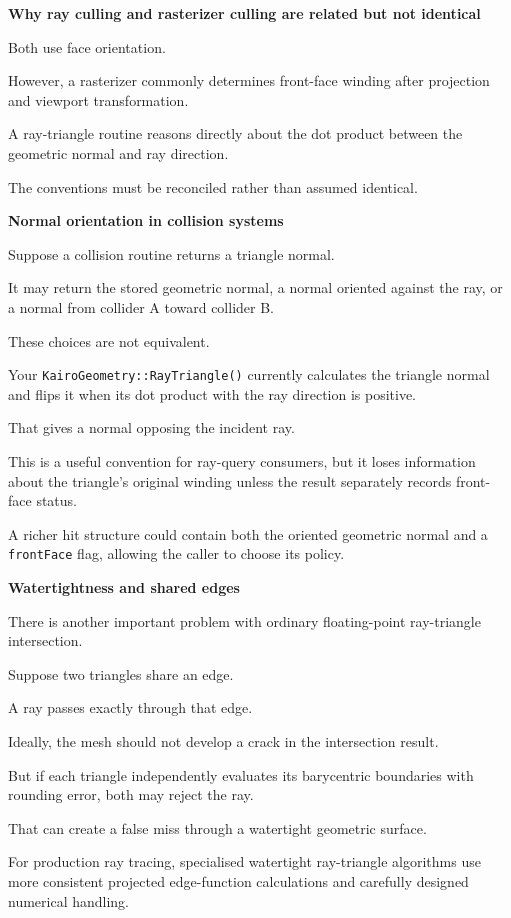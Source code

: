 \textbf{Why ray culling and rasterizer culling are related but not identical}

Both use face orientation.

However, a rasterizer commonly determines front-face winding after projection and viewport transformation.

A ray-triangle routine reasons directly about the dot product between the geometric normal and ray direction.

The conventions must be reconciled rather than assumed identical.

\textbf{Normal orientation in collision systems}

Suppose a collision routine returns a triangle normal.

It may return the stored geometric normal, a normal oriented against the ray, or a normal from collider A toward collider B.

These choices are not equivalent.

Your \texttt{KairoGeometry::RayTriangle()} currently calculates the triangle normal and flips it when its dot product with the ray direction is positive.

That gives a normal opposing the incident ray.

This is a useful convention for ray-query consumers, but it loses information about the triangle's original winding unless the result separately records front-face status.

A richer hit structure could contain both the oriented geometric normal and a \texttt{frontFace} flag, allowing the caller to choose its policy.

\textbf{Watertightness and shared edges}

There is another important problem with ordinary floating-point ray-triangle intersection.

Suppose two triangles share an edge.

A ray passes exactly through that edge.

Ideally, the mesh should not develop a crack in the intersection result.

But if each triangle independently evaluates its barycentric boundaries with rounding error, both may reject the ray.

That can create a false miss through a watertight geometric surface.

For production ray tracing, specialised watertight ray-triangle algorithms use more consistent projected edge-function calculations and carefully designed numerical handling.

